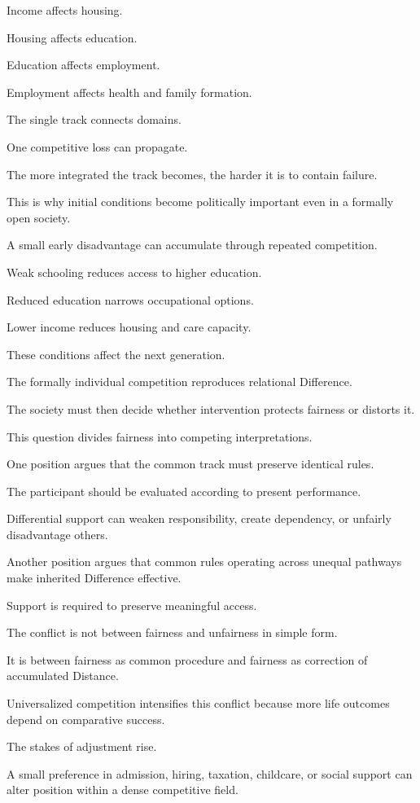 Income affects housing.

Housing affects education.

Education affects employment.

Employment affects health and family formation.

The single track connects domains.

One competitive loss can propagate.

The more integrated the track becomes, the harder it is to contain failure.

This is why initial conditions become politically important even in a formally open society.

A small early disadvantage can accumulate through repeated competition.

Weak schooling reduces access to higher education.

Reduced education narrows occupational options.

Lower income reduces housing and care capacity.

These conditions affect the next generation.

The formally individual competition reproduces relational Difference.

The society must then decide whether intervention protects fairness or distorts it.

This question divides fairness into competing interpretations.

One position argues that the common track must preserve identical rules.

The participant should be evaluated according to present performance.

Differential support can weaken responsibility, create dependency, or unfairly disadvantage others.

Another position argues that common rules operating across unequal pathways make inherited Difference effective.

Support is required to preserve meaningful access.

The conflict is not between fairness and unfairness in simple form.

It is between fairness as common procedure and fairness as correction of accumulated Distance.

Universalized competition intensifies this conflict because more life outcomes depend on comparative success.

The stakes of adjustment rise.

A small preference in admission, hiring, taxation, childcare, or social support can alter position within a dense competitive field.

